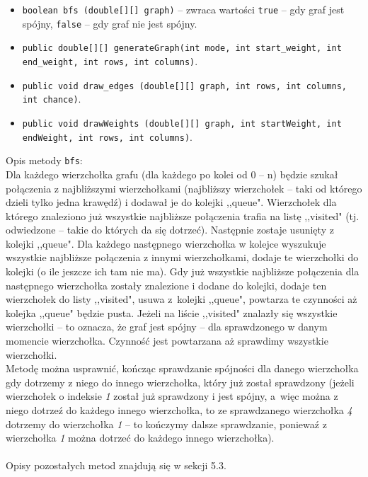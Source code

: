 \documentclass[12pt, a4paper]{article}
\begin{document}
\begin{itemize}
    \item \texttt{boolean bfs (double[][] graph)} -- zwraca wartości \texttt{true} -- gdy graf jest spójny, \texttt{false} -- gdy graf nie jest spójny.
    \item \texttt{public double[][] generateGraph(int mode, int start\_weight, int end\_weight, int rows, int columns)}.
    \item \texttt{public void draw\_edges (double[][] graph, int rows, int columns, int chance)}.
    \item \texttt{public void drawWeights (double[][] graph, int startWeight, int endWeight, int rows, int columns)}.
\end{itemize}

Opis metody \texttt{bfs}:\\
Dla każdego wierzchołka grafu (dla każdego po kolei od 0 -- n) będzie szukał połączenia z najbliższymi wierzchołkami (najbliższy wierzchołek -- taki od którego dzieli tylko jedna krawędź) i dodawał je do kolejki ,,queue". Wierzchołek dla którego znaleziono już wszystkie najbliższe połączenia trafia na listę ,,visited" (tj. odwiedzone -- takie do których da się dotrzeć). Następnie zostaje usunięty z kolejki ,,queue". Dla każdego następnego wierzchołka w kolejce wyszukuje wszystkie najbliższe połączenia z innymi wierzchołkami, dodaje te wierzchołki do kolejki (o ile jeszcze ich tam nie ma). Gdy już wszystkie najbliższe połączenia dla następnego wierzchołka zostały znalezione i dodane do kolejki, dodaje ten wierzchołek do listy ,,visited", usuwa z~kolejki ,,queue", powtarza te czynności aż kolejka ,,queue" będzie pusta. Jeżeli na liście ,,visited" znalazły się wszystkie wierzchołki -- to oznacza, że graf jest spójny -- dla sprawdzonego w danym momencie wierzchołka. Czynność jest powtarzana aż sprawdimy wszystkie wierzchołki.\\
Metodę można usprawnić, kończąc sprawdzanie spójności dla danego wierzchołka gdy dotrzemy z niego do innego wierzchołka, który już został sprawdzony (jeżeli wierzchołek o indeksie \textit{1} został już sprawdzony i jest spójny, a~więc można z niego dotrzeź do każdego innego wierzchołka, to ze sprawdzanego wierzchołka \textit{4} dotrzemy do wierzchołka \textit{1} -- to kończymy dalsze sprawdzanie, poniewaź z wierzchołka \textit{1} można dotrzeć do każdego innego wierzchołka).\\\\
Opisy pozostałych metod znajdują się w sekcji 5.3.
\end{document}
